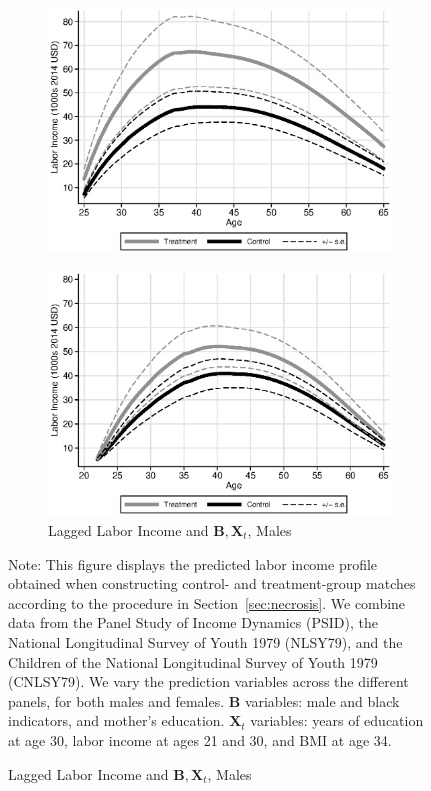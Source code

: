 \begin{figure}
\begin{subfigure}[h]{0.3\textwidth}
		\includegraphics[width=\textwidth]{output/labor_25-65_pset6_mset3_male.eps}
\end{subfigure}%
\begin{subfigure}[h]{0.3\textwidth}
	\centering
	\caption{Lagged Labor Income and $\bm{B}, \bm{X}_{t}$, Males}
		\includegraphics[width=\textwidth]{output/labor_25-65_pset1_mset3_male_sensitivity.eps}
\end{subfigure}
\footnotesize \justify
Note: This figure displays the predicted labor income profile obtained when constructing control- and treatment-group matches according to the procedure in Section~\ref{sec:necrosis}. We combine data from the Panel Study of Income Dynamics (PSID), the National Longitudinal Survey of Youth 1979 (NLSY79), and the Children of the National Longitudinal Survey of Youth 1979 (CNLSY79). We vary the prediction variables across the different panels, for both males and females. $\bm{B}$ variables: male and black indicators, and mother's education. $\bm{X}_{t}$ variables: years of education at age 30, labor income at ages 21 and 30, and BMI at age 34.
\end{figure}

